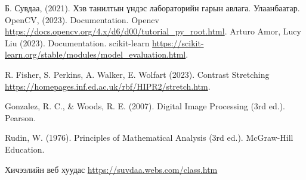 \begin{thebibliography}{}
	Б. Сувдаа, (2021). Хэв танилтын үндэс лабораторийн гарын авлага. Улаанбаатар.
	OpenCV, (2023). Documentation. Opencv \url{https://docs.opencv.org/4.x/d6/d00/tutorial_py_root.html}.
	Arturo Amor, Lucy Liu
	(2023). Documentation. scikit-learn \url{https://scikit-learn.org/stable/modules/model_evaluation.html}.

	R. Fisher,
	S. Perkins,
	A. Walker,
	E. Wolfart
	(2023). Contrast Stretching \url{https://homepages.inf.ed.ac.uk/rbf/HIPR2/stretch.htm}.

	Gonzalez, R. C., \& Woods, R. E. (2007). Digital Image Processing (3rd ed.). Pearson.

	Rudin, W. (1976). Principles of Mathematical Analysis (3rd ed.). McGraw-Hill Education.

	Хичээлийн веб хуудас
	\url{https://suvdaa.webs.com/class.htm}


\end{thebibliography}